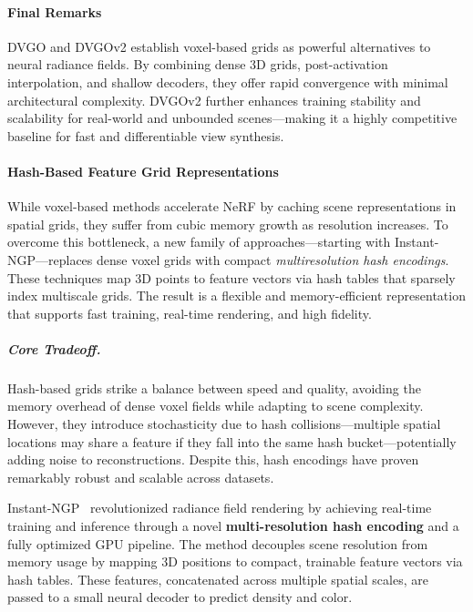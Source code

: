 \begin{enrichment}
\begin{enrichment}
    \paragraph{Final Remarks}
    
    DVGO and DVGOv2 establish voxel-based grids as powerful alternatives to neural radiance fields. By combining dense 3D grids, post-activation interpolation, and shallow decoders, they offer rapid convergence with minimal architectural complexity. DVGOv2 further enhances training stability and scalability for real-world and unbounded scenes—making it a highly competitive baseline for fast and differentiable view synthesis.
\end{enrichment} 
    
    \paragraph{Hash-Based Feature Grid Representations}
    \label{par:chapter23_nerf_hash_grids}
    
    While voxel-based methods accelerate NeRF by caching scene representations in spatial grids, they suffer from cubic memory growth as resolution increases. To overcome this bottleneck, a new family of approaches—starting with Instant-NGP—replaces dense voxel grids with compact \emph{multiresolution hash encodings}. These techniques map 3D points to feature vectors via hash tables that sparsely index multiscale grids. The result is a flexible and memory-efficient representation that supports fast training, real-time rendering, and high fidelity.
    
    \subparagraph{Core Tradeoff.} Hash-based grids strike a balance between speed and quality, avoiding the memory overhead of dense voxel fields while adapting to scene complexity. However, they introduce stochasticity due to hash collisions—multiple spatial locations may share a feature if they fall into the same hash bucket—potentially adding noise to reconstructions. Despite this, hash encodings have proven remarkably robust and scalable across datasets.
    
    \newpage
    
    \begin{enrichment}
        \label{enr:subsec_chapter23_instant_ngp}
    
    Instant-NGP~\cite{mueller2022_instantngp} revolutionized radiance field rendering by achieving real-time training and inference through a novel \textbf{multi-resolution hash encoding} and a fully optimized GPU pipeline. The method decouples scene resolution from memory usage by mapping 3D positions to compact, trainable feature vectors via hash tables. These features, concatenated across multiple spatial scales, are passed to a small neural decoder to predict density and color.
    

\end{enrichment}
\end{enrichment}
